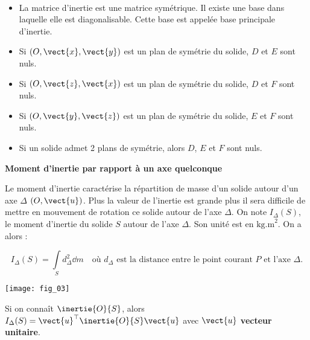 \begin{prop}~\\

\begin{itemize}[label=,font=\color{ocre}] 
\item La matrice d'inertie est une matrice symétrique. Il existe une base dans laquelle elle est diagonalisable. Cette base est appelée base principale d'inertie. 
\item Si $\left(O,\vect{x},\vect{y} \right)$ est un plan de symétrie du solide, $D$ et $E$ sont nuls.
\item Si $\left(O,\vect{z},\vect{x} \right)$ est un plan de symétrie du solide, $D$ et $F$ sont nuls.
\item Si $\left(O,\vect{y},\vect{z} \right)$ est un plan de symétrie du solide, $E$ et $F$ sont nuls.
\item Si un solide admet 2 plans de symétrie, alors $D$, $E$ et $F$ sont nuls. 
\end{itemize}

\end{prop}

\begin{defi}\textbf{Moment d'inertie par rapport à un axe quelconque}~\\

\noindent\begin{minipage}[c]{.65\linewidth}
Le moment d’inertie caractérise la répartition de masse d’un solide autour d’un axe $\Delta$ $\left(O,\vect{u}\right)$. Plus la valeur
de l’inertie est grande plus il sera difficile de mettre en mouvement de rotation ce solide autour de
l’axe $\Delta$. 
On note $I_{\Delta}(S)$, le moment d’inertie du solide $S$ autour de l’axe $\Delta$. Son unité est en $\text{kg.m}^2$. On a alors :

$$I_{\Delta}(S)=\int\limits_{S} d_{\Delta}^2 \dd m \quad \text{où } d_{\Delta} \text{ est la distance entre le point courant } P \text{ et l’axe }\Delta.$$
\end{minipage}\hfill
\begin{minipage}[c]{.3\linewidth}
\begin{center}
\texttt{[image: fig\_03]}
\end{center}
\end{minipage}

\begin{rem}
Si on connaît $\inertie{O}{S}$, alors $I_{\Delta}(S)=\vect{u}^\top\inertie{O}{S}\vect{u}$ avec $\vect{u}$ \textbf{vecteur unitaire}.
\end{rem}
\end{defi}

